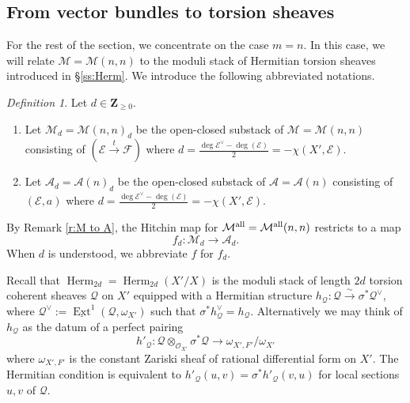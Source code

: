 \documentclass[reqno]{amsart}
\numberwithin{equation}{section}
\newcommand{\Z}{\mathbf{Z}}
\newcommand{\ul}[1]{\underline{#1}}
\newcommand{\ol}[1]{\overline{#1}}
\newcommand{\Cal}[1]{\mathcal{#1}}
\newcommand{\co}{\colon}
\DeclareMathOperator{\Bun}{Bun}
\DeclareMathOperator{\Ext}{Ext}
\DeclareMathOperator{\Sht}{Sht}
\DeclareMathOperator{\Herm}{Herm}
\DeclareMathOperator{\all}{all}
\newcommand\xr{\xrightarrow}
\newcommand\ot{\otimes}
\newcommand{\s}{\sigma}
\newcommand\cA{\mathcal{A}}
\newcommand\cE{\mathcal{E}}
\newcommand\cF{\mathcal{F}}
\newcommand\cM{\mathcal{M}}
\newcommand\cO{\mathcal{O}}
\newcommand\cQ{\mathcal{Q}}
\theoremstyle{remark}
\newtheorem{defn}[thm]{Definition}
\numberwithin{equation}{section}
\begin{document}







\subsection{From vector bundles to torsion sheaves}\label{ss:vb to tor}
For the rest of the section, we concentrate on the case $m=n$. In this case, we will relate $\cM = \cM(n,n)$ to the moduli stack of Hermitian torsion sheaves introduced in \S\ref{ss:Herm}.  We introduce the following abbreviated notations.

\begin{defn} Let $d\in \Z_{\ge0}$.
\begin{enumerate}
\item Let $\cM_{d} = \cM(n,n)_d$ be the open-closed substack of $\cM = \cM(n,n)$ consisting of $(\cE\xr{t}\cF)$ where $d=\frac{\deg\cE^\vee-\deg(\cE)}{2}=-\chi(X',\cE)$.  
\item Let $\cA_{d}  = \cA(n)_d$ be the open-closed substack of $\cA = \cA(n)$ consisting of $(\cE,a)$ where $d=\frac{\deg\cE^\vee-\deg(\cE)}{2}=-\chi(X',\cE)$.
\end{enumerate}
\end{defn}

By Remark \ref{r:M to A}, the Hitchin map for $\cM ^{\rm all}= \cM^{\rm all}(n,n)$ restricts to a map 
\begin{equation}
f_{d}: \cM_{d}\to \cA_{d}.
\end{equation}
When $d$ is understood, we abbreviate $f$ for $f_{d}$.


Recall that  $\Herm_{2d}=\Herm_{2d}(X'/X)$ is the moduli stack of length $2d$ torsion coherent sheaves $\cQ$ on $X'$ equipped with a Hermitian structure $h_{\cQ} \co \cQ \xrightarrow{\sim} \s^{*}\cQ^{\vee}$, where $\cQ^{\vee} := \ul{\Ext}^1(\cQ, \omega_{X'})$ such that $\sigma^* h_{\cQ}^{\vee}=h_{\cQ}$.  Alternatively we may think of $h_{\cQ}$ as the datum of a perfect pairing 
\begin{equation}
h'_{\cQ}: \cQ\ot_{\cO_{X'}}\s^{*}\cQ\to \omega_{X',F'}/\omega_{X'}
\end{equation}
where $\omega_{X',F'}$ is the constant Zariski sheaf of rational differential form on $X'$. The Hermitian condition is equivalent to $h'_{\cQ}(u,v)=\s^{*}h'_{\cQ}(v,u)$ for local sections $u,v$ of $\cQ$.
 
\end{document}
